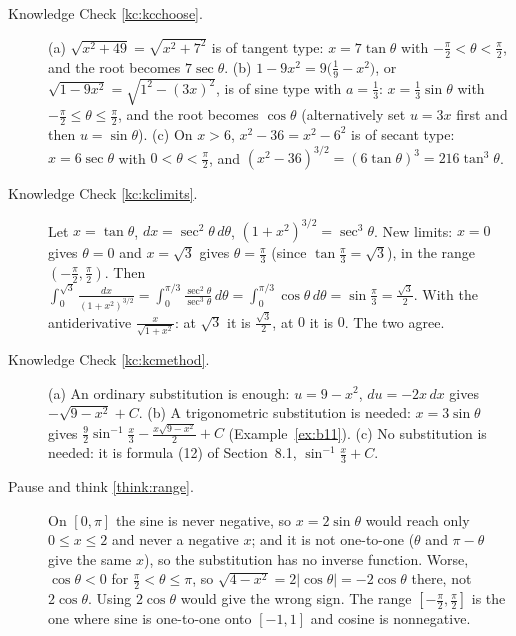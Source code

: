 \documentclass[11pt]{article}
\begin{document}
\begin{description}
  \item[Knowledge Check \ref{kc:kcchoose}.] (a) $\sqrt{x^2+49}=\sqrt{x^2+7^2}$ is of tangent type: $x=7\tan\theta$ with $-\frac\pi2<\theta<\frac\pi2$, and the root becomes $7\sec\theta$. (b) $1-9x^2=9\big(\frac19-x^2\big)$, or $\sqrt{1-9x^2}=\sqrt{1^2-(3x)^2}$, is of sine type with $a=\frac13$: $x=\frac13\sin\theta$ with $-\frac\pi2\le\theta\le\frac\pi2$, and the root becomes $\cos\theta$ (alternatively set $u=3x$ first and then $u=\sin\theta$). (c) On $x>6$, $x^2-36=x^2-6^2$ is of secant type: $x=6\sec\theta$ with $0<\theta<\frac\pi2$, and $(x^2-36)^{3/2}=(6\tan\theta)^3=216\tan^3\theta$.

  \item[Knowledge Check \ref{kc:kclimits}.] Let $x=\tan\theta$, $dx=\sec^2\theta\,d\theta$, $(1+x^2)^{3/2}=\sec^3\theta$. New limits: $x=0$ gives $\theta=0$ and $x=\sqrt3$ gives $\theta=\frac\pi3$ (since $\tan\frac\pi3=\sqrt3$), in the range $\left(-\frac\pi2,\frac\pi2\right)$. Then $\int_0^{\sqrt3}\frac{dx}{(1+x^2)^{3/2}}=\int_0^{\pi/3}\frac{\sec^2\theta}{\sec^3\theta}\,d\theta=\int_0^{\pi/3}\cos\theta\,d\theta=\sin\frac\pi3=\frac{\sqrt3}2$. With the antiderivative $\frac x{\sqrt{1+x^2}}$: at $\sqrt3$ it is $\frac{\sqrt3}2$, at $0$ it is $0$. The two agree.

  \item[Knowledge Check \ref{kc:kcmethod}.] (a) An ordinary substitution is enough: $u=9-x^2$, $du=-2x\,dx$ gives $-\sqrt{9-x^2}+C$. (b) A trigonometric substitution is needed: $x=3\sin\theta$ gives $\frac92\sin^{-1}\frac x3-\frac{x\sqrt{9-x^2}}2+C$ (Example~\ref{ex:b11}). (c) No substitution is needed: it is formula (12) of Section~8.1, $\sin^{-1}\frac x3+C$.

  \item[Pause and think \ref{think:range}.] On $[0,\pi]$ the sine is never negative, so $x=2\sin\theta$ would reach only $0\le x\le2$ and never a negative $x$; and it is not one-to-one ($\theta$ and $\pi-\theta$ give the same $x$), so the substitution has no inverse function. Worse, $\cos\theta<0$ for $\frac\pi2<\theta\le\pi$, so $\sqrt{4-x^2}=2\lvert\cos\theta\rvert=-2\cos\theta$ there, not $2\cos\theta$. Using $2\cos\theta$ would give the wrong sign. The range $\left[-\frac\pi2,\frac\pi2\right]$ is the one where sine is one-to-one onto $[-1,1]$ and cosine is nonnegative.


\end{description}
\end{document}
